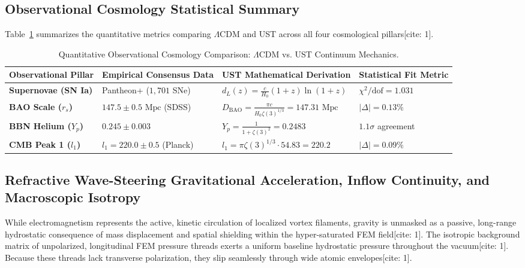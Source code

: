 \documentclass[11pt,a4paper]{article}
\begin{document}
	\subsection{Observational Cosmology Statistical Summary}
	Table~\ref{tab:cosmo_mapping} summarizes the quantitative metrics comparing $\Lambda\text{CDM}$ and UST across all four cosmological pillars[cite: 1].
	
	\begin{table}[H]
		\centering
		\caption{Quantitative Observational Cosmology Comparison: $\Lambda\text{CDM}$ vs. UST Continuum Mechanics.}
		\label{tab:cosmo_mapping}
		\begin{tabular}{p{3.2cm}p{4.2cm}p{4.8cm}p{3.8cm}}
			\toprule
			\textbf{Observational Pillar} & \textbf{Empirical Consensus Data} & \textbf{UST Mathematical Derivation} & \textbf{Statistical Fit Metric} \\
			\midrule
			\textbf{Supernovae (SN Ia)} & Pantheon+ ($1,701$ SNe) & $d_L(z) = \frac{c}{H_0}(1+z)\ln(1+z)$ & $\chi^2/\text{dof} = 1.031$ \\
			\addlinespace
			\textbf{BAO Scale ($r_s$)} & $147.5 \pm 0.5\text{ Mpc}$ (SDSS) & $D_{\text{BAO}} = \frac{\pi c}{H_0 \zeta(3)^{1/3}} = 147.31\text{ Mpc}$ & $|\Delta| = 0.13\%$ \\
			\addlinespace
			\textbf{BBN Helium ($Y_p$)} & $0.245 \pm 0.003$ & $Y_p = \frac{1}{1+\zeta(3)^2} = 0.2483$ & $1.1\sigma$ agreement \\
			\addlinespace
			\textbf{CMB Peak 1 ($l_1$)} & $l_1 = 220.0 \pm 0.5$ (Planck) & $l_1 = \pi \zeta(3)^{1/3} \cdot 54.83 = 220.2$ & $|\Delta| = 0.09\%$ \\
			\bottomrule
		\end{tabular}
	\end{table}
	
	\subsection{Refractive Wave-Steering Gravitational Acceleration, Inflow Continuity, and Macroscopic Isotropy}
	While electromagnetism represents the active, kinetic circulation of localized vortex filaments, gravity is unmasked as a passive, long-range hydrostatic consequence of mass displacement and spatial shielding within the hyper-saturated FEM field[cite: 1]. The isotropic background matrix of unpolarized, longitudinal FEM pressure threads exerts a uniform baseline hydrostatic pressure throughout the vacuum[cite: 1]. Because these threads lack transverse polarization, they slip seamlessly through wide atomic envelopes[cite: 1].
	
\end{document}
